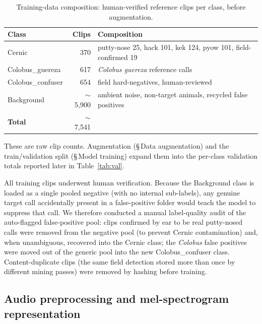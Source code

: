 \documentclass[final,3p,times]{elsarticle}
\begin{document}
\begin{table}[H]
\centering
\caption{Training-data composition: human-verified reference clips per class,
before augmentation.}
\label{tab:traindata}
\begin{tabularx}{\linewidth}{lrX}
\toprule
Class & Clips & Composition \\
\midrule
Cernic            & 370          & putty-nose 25, hack 101, kek 124, pyow 101,
                                   field-confirmed 19 \\
Colobus\_guereza  & 617          & \textit{Colobus guereza} reference calls \\
Colobus\_confuser & 654          & field hard-negatives, human-reviewed \\
Background        & $\sim$5{,}900 & ambient noise, non-target animals,
                                   recycled false positives \\
\midrule
\textbf{Total}    & $\sim$7{,}541 & \\
\bottomrule
\end{tabularx}
\end{table}

\noindent These are raw clip counts. Augmentation (\S\,Data augmentation) and the
train/validation split (\S\,Model training) expand them into the per-class validation
totals reported later in Table~\ref{tab:val}.

\noindent All training clips underwent human verification. Because the
Background class is loaded as a single pooled negative (with no internal
sub-labels), any genuine target call accidentally present in a false-positive
folder would teach the model to suppress that call. We therefore conducted a
manual label-quality audit of the auto-flagged false-positive pool: clips
confirmed by ear to be real putty-nosed calls were removed from the negative
pool (to prevent Cernic contamination) and, when unambiguous, recovered into
the Cernic class; the \textit{Colobus}
false positives were moved out of the generic pool into the new
Colobus\_confuser class. Content-duplicate clips (the same field
detection stored more than once by different mining passes) were removed by
hashing before training.

\subsection*{Audio preprocessing and mel-spectrogram representation}
\end{document}
